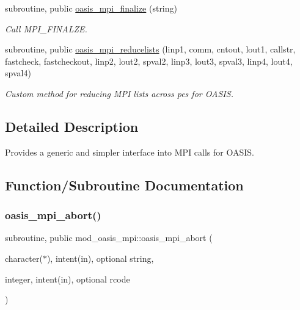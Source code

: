 \begin{DoxyCompactItemize}
subroutine, public \hyperlink{namespacemod__oasis__mpi_a0a601a3f718c0704db99a21b2c43fbcd}{oasis\+\_\+mpi\+\_\+finalize} (string)
\begin{DoxyCompactList}\small\item\em Call M\+P\+I\+\_\+\+F\+I\+N\+A\+L\+ZE. \end{DoxyCompactList}\item 
subroutine, public \hyperlink{namespacemod__oasis__mpi_a95f6540150f7ab4e64697d2eabc2bf79}{oasis\+\_\+mpi\+\_\+reducelists} (linp1, comm, cntout, lout1, callstr, fastcheck, fastcheckout, linp2, lout2, spval2, linp3, lout3, spval3, linp4, lout4, spval4)
\begin{DoxyCompactList}\small\item\em Custom method for reducing M\+PI lists across pes for O\+A\+S\+IS. \end{DoxyCompactList}\end{DoxyCompactItemize}


\subsection{Detailed Description}
Provides a generic and simpler interface into M\+PI calls for O\+A\+S\+IS. 

\subsection{Function/\+Subroutine Documentation}
\mbox{\label{namespacemod__oasis__mpi_a5b21b6d8732d5f7b70d8b20cefe0072f}} 
\subsubsection{\texorpdfstring{oasis\+\_\+mpi\+\_\+abort()}{oasis\_mpi\_abort()}}
{\footnotesize\ttfamily subroutine, public mod\+\_\+oasis\+\_\+mpi\+::oasis\+\_\+mpi\+\_\+abort (\begin{DoxyParamCaption}\item[{character($\ast$), intent(in), optional}]{string,  }\item[{integer, intent(in), optional}]{rcode }\end{DoxyParamCaption})}



